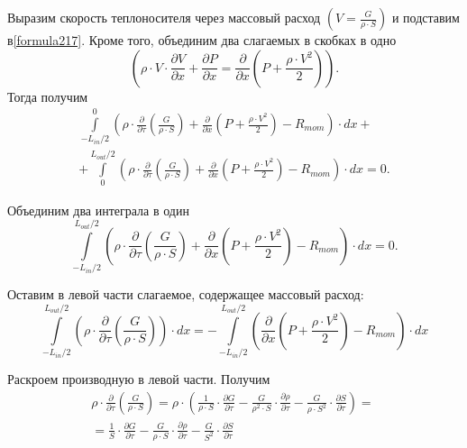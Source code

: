 Выразим скорость теплоносителя через массовый расход $\left(V = \frac{G}{\rho \cdot S}\right)$ и подставим в\linebreak \eqref{formula217}. Кроме того, объединим два слагаемых в скобках в одно
$$\left(\rho\cdot V \cdot \frac{\partial V}{\partial x}+\frac{\partial P}{\partial x}=\frac{\partial}{\partial x}\left(P + \frac{\rho \cdot V^2}{2} \right) \right).$$ 
Тогда получим
\begin{eqnarray}
\label{formula219}
\int\limits_{-L_{in}/2}^{0} \left(\rho\cdot\frac{\partial}{\partial\tau}\left(\frac{G}{\rho \cdot S}        \right)+\frac{\partial}{\partial x}\left(P + \frac{\rho \cdot V^2}{2} \right)   -R_{mom}\right) \cdot dx + \nonumber ~\\
+ \int\limits_{0}^{L_{out}/2} \left(\rho\cdot\frac{\partial}{\partial\tau}\left(\frac{G}{\rho \cdot S}        \right)+\frac{\partial}{\partial x}\left(P + \frac{\rho \cdot V^2}{2} \right)   -R_{mom}\right) \cdot dx = 0.
\end{eqnarray}

Объединим два интеграла в один
\begin{equation}
\label{formula220}
\int\limits_{-L_{in}/2}^{L_{out}/2} \left(\rho\cdot\frac{\partial}{\partial\tau}\left(\frac{G}{\rho \cdot S}        \right)+\frac{\partial}{\partial x}\left(P + \frac{\rho \cdot V^2}{2} \right)   -R_{mom}\right) \cdot dx = 0.
\end{equation}

Оставим в левой части слагаемое, содержащее массовый расход:
\begin{equation}
\label{formula221}
\int\limits_{-L_{in}/2}^{L_{out}/2} \left(\rho\cdot\frac{\partial}{\partial\tau}\left(\frac{G}{\rho \cdot S}        \right)\right) \cdot dx = 
-\int\limits_{-L_{in}/2}^{L_{out}/2} 
\left(\frac{\partial}{\partial x}\left(P + \frac{\rho \cdot V^2}{2} \right)   -R_{mom}\right)
\cdot dx
\end{equation}

Раскроем производную в левой части. Получим
\begin{eqnarray}
\label{formula222}
\rho\cdot\frac{\partial}{\partial\tau}\left(\frac{G}{\rho \cdot S}\right) = 
\rho\cdot \left(\frac 1 {\rho \cdot S} \cdot \frac{\partial G}{\partial\tau}-\frac{G}{\rho^2 \cdot S} \cdot \frac{\partial\rho}{\partial\tau}-\frac{G}{\rho \cdot S^2} \cdot \frac{\partial S}{\partial\tau}\right) = \nonumber ~\\
= \frac 1 S \cdot \frac{\partial G}{\partial\tau}-\frac{G}{\rho \cdot S} \cdot \frac{\partial\rho}{\partial\tau}-\frac{G}{S^2} \cdot \frac{\partial S}{\partial\tau}
\end{eqnarray}

